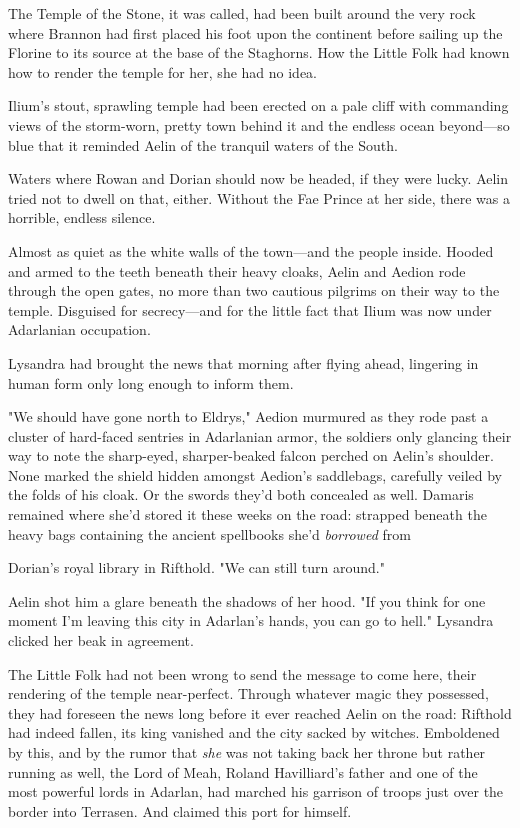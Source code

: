 The Temple of the Stone, it was called, had been built around the very rock where Brannon had first placed his foot upon the continent before sailing up the Florine to its source at the base of the Staghorns. How the Little Folk had known how to render the temple for her, she had no idea.

Ilium's stout, sprawling temple had been erected on a pale cliff with commanding views of the storm-worn, pretty town behind it and the endless ocean beyond---so blue that it reminded Aelin of the tranquil waters of the South.

Waters where Rowan and Dorian should now be headed, if they were lucky. Aelin tried not to dwell on that, either. Without the Fae Prince at her side, there was a horrible, endless silence.

Almost as quiet as the white walls of the town---and the people inside. Hooded and armed to the teeth beneath their heavy cloaks, Aelin and Aedion rode through the open gates, no more than two cautious pilgrims on their way to the temple. Disguised for secrecy---and for the little fact that Ilium was now under Adarlanian occupation.

Lysandra had brought the news that morning after flying ahead, lingering in human form only long enough to inform them.

"We should have gone north to Eldrys," Aedion murmured as they rode past a cluster of hard-faced sentries in Adarlanian armor, the soldiers only glancing their way to note the sharp-eyed, sharper-beaked falcon perched on Aelin's shoulder. None marked the shield hidden amongst Aedion's saddlebags, carefully veiled by the folds of his cloak. Or the swords they'd both concealed as well. Damaris remained where she'd stored it these weeks on the road: strapped beneath the heavy bags containing the ancient spellbooks she'd \emph{borrowed} from

Dorian's royal library in Rifthold. "We can still turn around."

Aelin shot him a glare beneath the shadows of her hood. "If you think for one moment I'm leaving this city in Adarlan's hands, you can go to hell." Lysandra clicked her beak in agreement.

The Little Folk had not been wrong to send the message to come here, their rendering of the temple near-perfect. Through whatever magic they possessed, they had foreseen the news long before it ever reached Aelin on the road: Rifthold had indeed fallen, its king vanished and the city sacked by witches. Emboldened by this, and by the rumor that \emph{she}
was not taking back her throne but rather running as well, the Lord of Meah, Roland Havilliard's father and one of the most powerful lords in Adarlan, had marched his garrison of troops just over the border into Terrasen. And claimed this port for himself.

